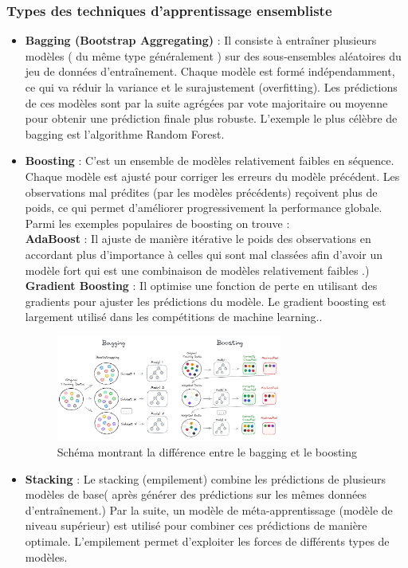 \subsubsection{Types des techniques d'apprentissage ensembliste} 
\begin{itemize}[label=$\bullet$] 

\item \textbf{Bagging (Bootstrap Aggregating)} :
Il consiste à entraîner plusieurs modèles ( du même type généralement ) sur des sous-ensembles aléatoires du jeu de données d’entraînement.
Chaque modèle est formé indépendamment, ce qui va réduir la variance et le surajustement (overfitting).
Les prédictions de ces modèles sont par la suite agrégées par vote majoritaire ou moyenne pour obtenir une prédiction finale plus robuste.
L’exemple le plus célèbre de bagging est l’algorithme Random Forest.

\item \textbf{Boosting} :
C'est un ensemble de modèles relativement faibles en séquence.
Chaque modèle est ajusté pour corriger les erreurs du modèle précédent. Les observations mal prédites (par les modèles précédents) reçoivent plus de poids, ce qui permet d’améliorer progressivement la performance globale.
Parmi les exemples populaires de boosting on trouve : \\ \textbf{AdaBoost} : Il ajuste de manière itérative le poids des observations en accordant plus d’importance à celles qui sont mal classées afin d'avoir un modèle fort qui est une combinaison de modèles relativement faibles .) \\
\textbf{Gradient Boosting} : Il optimise une fonction de perte en utilisant des gradients pour ajuster les prédictions du modèle.
Le gradient boosting est largement utilisé dans les compétitions de machine learning..

    \begin{figure}[htbp]
     \centering    \includegraphics[width=0.7\textwidth,height=0.22\textheight]{img/baggingVSboosting.png}
     \caption{Schéma montrant la différence entre le bagging et le boosting \cite{sundararajan2021}}
     \label{fig:example19}
     \end{figure}
\item \textbf{Stacking} :
Le stacking (empilement) combine les prédictions de plusieurs modèles de base( après générer des prédictions sur les mêmes données d’entraînement.)
Par la suite, un modèle de méta-apprentissage (modèle de niveau supérieur) est utilisé pour combiner ces prédictions de manière optimale.
L'empilement permet d’exploiter les forces de différents types de modèles.


\end{itemize}
